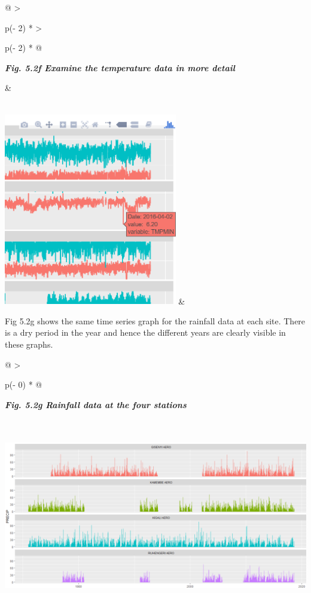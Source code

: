\documentclass[
  letterpaper,
  DIV=11,
  numbers=noendperiod]{scrreprt}
\begin{document}
\begin{longtable}[]{@{}
  >{\raggedright\arraybackslash}p{(\columnwidth - 2\tabcolsep) * }
  >{\raggedright\arraybackslash}p{(\columnwidth - 2\tabcolsep) * }@{}}
\toprule\noalign{}
\begin{minipage}[b]{\linewidth}\raggedright
\textbf{\emph{Fig. 5.2f Examine the temperature data in more detail}}
\end{minipage} & \begin{minipage}[b]{\linewidth}\raggedright
\end{minipage} \\
\midrule\noalign{}
\endhead
\bottomrule\noalign{}
\endlastfoot
\includegraphics[width=2.97502in,height=3.30958in]{figures/Fig5.2f.png}
& \\
\end{longtable}

Fig 5.2g shows the same time series graph for the rainfall data at each
site. There is a dry period in the year and hence the different years
are clearly visible in these graphs.

\begin{longtable}[]{@{}
  >{\raggedright\arraybackslash}p{(\columnwidth - 0\tabcolsep) * }@{}}
\toprule\noalign{}
\begin{minipage}[b]{\linewidth}\raggedright
\textbf{\emph{Fig. 5.2g Rainfall data at the four stations}}
\end{minipage} \\
\midrule\noalign{}
\endhead
\bottomrule\noalign{}
\endlastfoot
\includegraphics[width=6.05294in,height=2.93191in]{figures/Fig5.2g.png} \\
\end{longtable}
\end{document}
